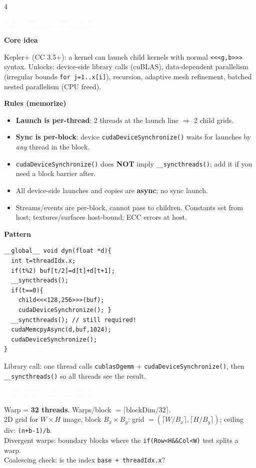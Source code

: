\documentclass[10pt]{extarticle}
\newcommand{\sect}[1]{\vspace{3pt}\par\colorbox{hdr}{\textcolor{white}{\textbf{\small #1}}}\par\vspace{2pt}}
\newcommand{\sub}[1]{\vspace{2pt}\par\textbf{\footnotesize\textcolor{hdr}{#1}}\par}
\begin{document}
\begin{multicols*}{4}
\sect{L14: Dynamic Parallelism}
\sub{Core idea}
Kepler+ (CC 3.5+): a kernel can launch child kernels with normal \texttt{<<<g,b>>>} syntax. Unlocks: device-side library calls (cuBLAS), data-dependent parallelism (irregular bounds \texttt{for j=1..x[i]}), recursion, adaptive mesh refinement, batched nested parallelism (CPU freed).

\sub{Rules (memorize)}
\begin{itemize}
\item \textbf{Launch is per-thread}: 2 threads at the launch line $\Rightarrow$ 2 child grids.
\item \textbf{Sync is per-block}: device \texttt{cudaDeviceSynchronize()} waits for launches by \emph{any} thread in the block.
\item \texttt{cudaDeviceSynchronize()} does \textbf{NOT} imply \texttt{\_\_syncthreads()}; add it if you need a block barrier after.
\item All device-side launches and copies are \textbf{async}; no sync launch.
\item Streams/events are per-block, cannot pass to children. Constants set from host; textures/surfaces host-bound; ECC errors at host.
\end{itemize}

\sub{Pattern}
\begin{lstlisting}
__global__ void dyn(float *d){
  int t=threadIdx.x;
  if(t%2) buf[t/2]=d[t]+d[t+1];
  __syncthreads();
  if(t==0){
    child<<<128,256>>>(buf);
    cudaDeviceSynchronize(); }
  __syncthreads(); // still required!
  cudaMemcpyAsync(d,buf,1024);
  cudaDeviceSynchronize();
}
\end{lstlisting}
Library call: one thread calls \texttt{cublasDgemm} + \texttt{cudaDeviceSynchronize()}, then \texttt{\_\_syncthreads()} so all threads see the result.

\sect{Carryover from Midterm 1}
Warp = \textbf{32 threads}. Warps/block $= \lceil \text{blockDim}/32 \rceil$.\\
2D grid for $W{\times}H$ image, block $B_x{\times}B_y$: grid $= (\lceil W/B_x\rceil, \lceil H/B_y\rceil)$; ceiling div: \texttt{(n+b-1)/b}.\\
Divergent warps: boundary blocks where the \texttt{if(Row<H\&\&Col<W)} test splits a warp.\\
Coalescing check: is the index \texttt{base + threadIdx.x}?


\end{multicols*}
\end{document}
